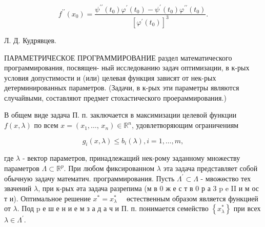 \documentclass[10pt]{article}
\begin{document}
\[

f^{\prime \prime}\left(x_{0}\right)=\frac{\psi^{\prime \prime}\left(t_{0}\right) \varphi^{\prime}\left(t_{0}\right)-\psi^{\prime}\left(t_{0}\right) \varphi^{\prime \prime}\left(t_{0}\right)}{\left[\varphi^{\prime}\left(t_{0}\right)\right]^{3}} .

\]



Л. Д. Кудрявцев.



ПАРАМЕТРИЧЕСКОЕ ПРОГРАММИРОВАНИЕ раздел математического программирования, посвящен- ный исследованию задач оптимизации, в к-рых условия допустимости и (или) целевая функция зависят от нек-рых детерминированных параметров. (Задачи, в к-рых эти параметры являются случайвыми, составляют предмет стохастического проераммирования.)



В общем виде задача П. п. заключается в максимизации целевой функции $f(x, \lambda)$ по всем $x=\left(x_{1}, \ldots\right.$, $\left.x_{n}\right) \in \mathbb{R}^{n}$, удовлетворяющим ограничениям



\[

g_{i}(x, \lambda) \leqslant b_{i}(\lambda), i=1, \ldots, m,

\]



где $\lambda$ - вектор параметров, принадлежащий нек-рому заданному множеству параметров $\Lambda \subset \mathbb{R}^{p}$. При любом фиксированном $\lambda$ эта задача представляет собой обычную задачу математич. программирования. Пусть $\Lambda^{\prime} \subset \Lambda$ - мвожөство тех звачений $\lambda$, при к-рых әта задача разрепима (м в 0 ж е с т в 0 р а 3 p e II и м ос т и). Оптимальное решение $x^{*}=x_{\lambda}^{*} \quad$ өстественным образом является функцией от $\lambda$. Под $\mathrm{p}$ е ш е н и е м з а д а ч и П. п. понимается семейство $\left\{x_{\lambda}^{*}\right\}$ при всех $\lambda \in \Lambda^{\prime}$.
\end{document}
